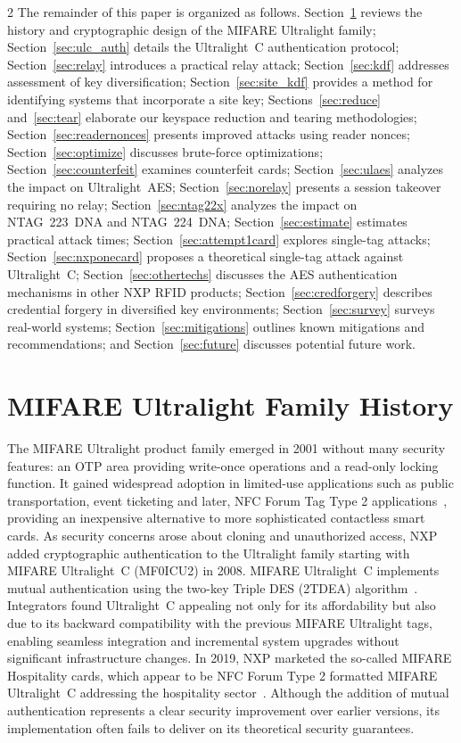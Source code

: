 \documentclass[10pt,letterpaper]{article}
\begin{document}
\begin{multicols}{2}
The remainder of this paper is organized as follows.
Section~\ref{sec:history} reviews the history and cryptographic design of the MIFARE Ultralight family;
Section~\ref{sec:ulc_auth} details the Ultralight~C authentication protocol;
Section~\ref{sec:relay} introduces a practical relay attack;
Section~\ref{sec:kdf} addresses assessment of key diversification;
Section~\ref{sec:site_kdf} provides a method for identifying systems that incorporate a site key;
Sections~\ref{sec:reduce} and~\ref{sec:tear} elaborate our keyspace reduction and tearing methodologies;
Section~\ref{sec:readernonces} presents improved attacks using reader nonces;
Section~\ref{sec:optimize} discusses brute-force optimizations;
Section~\ref{sec:counterfeit} examines counterfeit cards;
Section~\ref{sec:ulaes} analyzes the impact on Ultralight~AES;
Section~\ref{sec:norelay} presents a session takeover requiring no relay;
Section~\ref{sec:ntag22x} analyzes the impact on NTAG~223~DNA and NTAG~224~DNA;
Section~\ref{sec:estimate} estimates practical attack times;
Section~\ref{sec:attempt1card} explores single-tag attacks;
Section~\ref{sec:nxponecard} proposes a theoretical single-tag attack against Ultralight~C;
Section~\ref{sec:othertechs} discusses the AES authentication mechanisms in other NXP RFID products;
Section~\ref{sec:credforgery} describes credential forgery in diversified key environments; Section~\ref{sec:survey} surveys real-world systems;
Section~\ref{sec:mitigations} outlines known mitigations and recommendations;
and Section~\ref{sec:future} discusses potential future work.

\section{MIFARE Ultralight Family History}
\label{sec:history}
The MIFARE Ultralight product family emerged in 2001 without many security features: an OTP area providing write-once operations and a read-only locking function. It gained widespread adoption in limited-use applications such as public transportation, event ticketing and later, NFC Forum Tag Type 2 applications~\cite{mf0icu1_3r9_2014, aura_design}, providing an inexpensive alternative to more sophisticated contactless smart cards. As security concerns arose about cloning and unauthorized access, NXP added cryptographic authentication to the Ultralight family starting with MIFARE Ultralight~C (MF0ICU2) in 2008. MIFARE Ultralight~C implements mutual authentication using the two-key Triple DES (2TDEA) algorithm~\cite{mf0icu2_3r4_2024}. 
Integrators found Ultralight~C appealing not only for its affordability but also due to its backward compatibility with the previous MIFARE Ultralight tags, enabling seamless integration and incremental system upgrades without significant infrastructure changes.
In 2019, NXP marketed the so-called MIFARE Hospitality cards, which appear to be NFC Forum Type 2 formatted MIFARE Ultralight~C addressing the hospitality sector~\cite{nxp_mifare_hospitality_folder, nxp_mifare_hospitality, nxp_an10834}.
Although the addition of mutual authentication represents a clear security improvement over earlier versions, its implementation often fails to deliver on its theoretical security guarantees.


\end{multicols}
\end{document}
